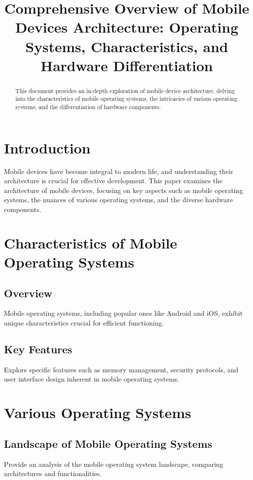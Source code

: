 \documentclass[conference]{IEEEtran}
\title{Comprehensive Overview of Mobile Devices Architecture: Operating Systems, Characteristics, and Hardware Differentiation}
\author{\IEEEauthorblockN{Castillo Mendez Josue Leonel}
	\IEEEauthorblockA{UTT\\
		0322103691@ut-tijuana.edu.mx}}
\date{}
\begin{document}
	
	\maketitle
	
	\begin{abstract}
		This document provides an in-depth exploration of mobile device architecture, delving into the characteristics of mobile operating systems, the intricacies of various operating systems, and the differentiation of hardware components.
	\end{abstract}
	
	\section{Introduction}
	Mobile devices have become integral to modern life, and understanding their architecture is crucial for effective development. This paper examines the architecture of mobile devices, focusing on key aspects such as mobile operating systems, the nuances of various operating systems, and the diverse hardware components.
	
	\section{Characteristics of Mobile Operating Systems}
	\subsection{Overview}
	Mobile operating systems, including popular ones like Android and iOS, exhibit unique characteristics crucial for efficient functioning.
	
	\subsection{Key Features}
	Explore specific features such as memory management, security protocols, and user interface design inherent in mobile operating systems.
	
	\section{Various Operating Systems}
	\subsection{Landscape of Mobile Operating Systems}
	Provide an analysis of the mobile operating system landscape, comparing architectures and functionalities.
	
\end{document}
